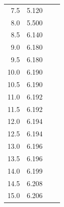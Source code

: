 \documentclass[a4paper,12pt]{article}
\begin{document}
\begin{center}
\begin{tabular}{|r|r|r|r|r|r|r|r|}
    7.5		& 5.120 &	& \multicolumn{5}{c|}{} \\ \cline{1-2} 
    8.0		& 5.500	&	& \multicolumn{5}{c|}{} \\ \cline{1-2} 
    8.5		& 6.140	&	& \multicolumn{5}{c|}{} \\ \cline{1-2} 
    9.0		& 6.180 &	& \multicolumn{5}{c|}{} \\ \cline{1-2} 
    9.5		& 6.180	&	& \multicolumn{5}{c|}{} \\ \cline{1-2} 
    10.0	& 6.190 &	& \multicolumn{5}{c|}{} \\ \cline{1-2} 
    10.5	& 6.190	&	& \multicolumn{5}{c|}{} \\ \cline{1-2} 
    11.0	& 6.192 &	& \multicolumn{5}{c|}{} \\ \cline{1-2} 
    11.5	& 6.192 &	& \multicolumn{5}{c|}{} \\ \cline{1-2} 
    12.0	& 6.194 &	& \multicolumn{5}{c|}{} \\ \cline{1-2} 
    12.5	& 6.194 &	& \multicolumn{5}{c|}{} \\ \cline{1-2} 
    13.0	& 6.196 &	& \multicolumn{5}{c|}{} \\ \cline{1-2} 
    13.5	& 6.196 &	& \multicolumn{5}{c|}{} \\ \cline{1-2} 
    14.0	& 6.199 &	& \multicolumn{5}{c|}{} \\ \cline{1-2} 
    14.5	& 6.208 &	& \multicolumn{5}{c|}{} \\ \cline{1-2} 
    15.0	& 6.206 &	& \multicolumn{5}{c|}{} \\ \hline
  \end{tabular}
  \end{center}
  
\end{document}
